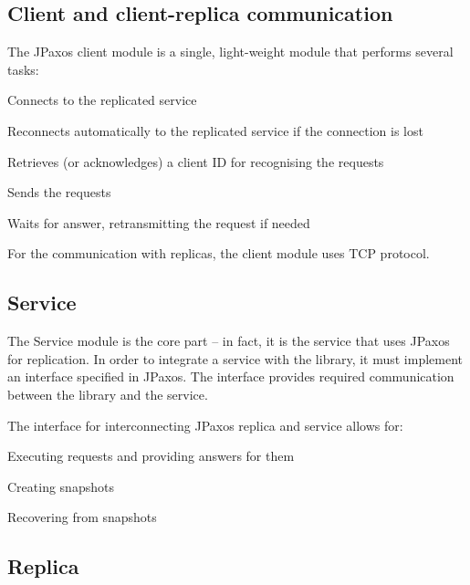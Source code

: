 \subsection{Client and client-replica communication}

The JPaxos client module is a single, light-weight module that performs several tasks:

\begin{tightList}[\setlength{\topsep}{0pt} \setlength{\partopsep}{0pt}]
 \item[\textbullet] Connects to the replicated service
 \item[\textbullet] Reconnects automatically to the replicated service if the connection is lost
 \item[\textbullet] Retrieves (or acknowledges) a client ID for recognising the requests
 \item[\textbullet] Sends the requests
 \item[\textbullet] Waits for answer, retransmitting the request if needed
\end{tightList}

\noindent For the communication with replicas, the client module uses TCP protocol.

\subsection{Service}


The Service module is the core part -- in fact, it is the service that uses JPaxos for replication.
In order to integrate a service with the library, it must implement an interface specified in JPaxos. The interface provides required communication between the library and the service.

The interface for interconnecting JPaxos replica and service allows for:
\begin{tightList}
 \item[\textbullet] Executing requests and providing answers for them
 \item[\textbullet] Creating snapshots
 \item[\textbullet] Recovering from snapshots
\end{tightList}

\subsection{Replica}

